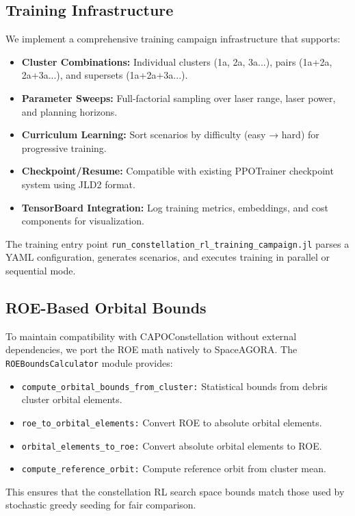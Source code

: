 \subsection{Training Infrastructure}

We implement a comprehensive training campaign infrastructure that supports:

\begin{itemize}
    \item \textbf{Cluster Combinations:} Individual clusters (1a, 2a, 3a...), pairs (1a+2a, 2a+3a...), and supersets (1a+2a+3a...).
    \item \textbf{Parameter Sweeps:} Full-factorial sampling over laser range, laser power, and planning horizons.
    \item \textbf{Curriculum Learning:} Sort scenarios by difficulty (easy → hard) for progressive training.
    \item \textbf{Checkpoint/Resume:} Compatible with existing PPOTrainer checkpoint system using JLD2 format.
    \item \textbf{TensorBoard Integration:} Log training metrics, embeddings, and cost components for visualization.
\end{itemize}

The training entry point \texttt{run\_constellation\_rl\_training\_campaign.jl} parses a YAML configuration, generates scenarios, and executes training in parallel or sequential mode.

\subsection{ROE-Based Orbital Bounds}

To maintain compatibility with CAPOConstellation without external dependencies, we port the ROE math natively to SpaceAGORA. The \texttt{ROEBoundsCalculator} module provides:

\begin{itemize}
    \item \texttt{compute\_orbital\_bounds\_from\_cluster:} Statistical bounds from debris cluster orbital elements.
    \item \texttt{roe\_to\_orbital\_elements:} Convert ROE to absolute orbital elements.
    \item \texttt{orbital\_elements\_to\_roe:} Convert absolute orbital elements to ROE.
    \item \texttt{compute\_reference\_orbit:} Compute reference orbit from cluster mean.
\end{itemize}

This ensures that the constellation RL search space bounds match those used by stochastic greedy seeding for fair comparison.
